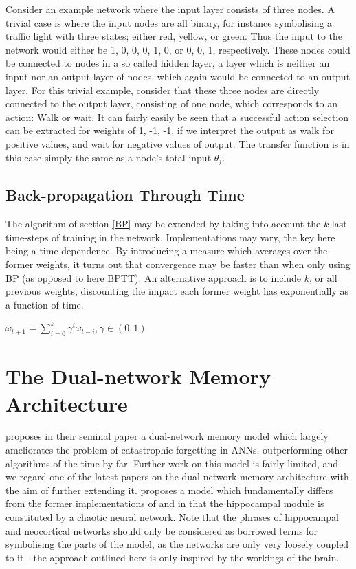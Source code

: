 Consider an example network where the input layer consists of three nodes. A trivial case is where the input nodes are all binary, for instance symbolising a traffic light with three states; either red, yellow, or green. Thus the input to the network would either be {1, 0, 0}, {0, 1, 0}, or {0, 0, 1}, respectively. These nodes could be connected to nodes in a so called hidden layer, a layer which is neither an input nor an output layer of nodes, which again would be connected to an output layer. For this trivial example, consider that these three nodes are directly connected to the output layer, consisting of one node, which corresponds to an action: Walk or wait. It can fairly easily be seen that a successful action selection can be extracted for weights of {1, -1, -1}, if we interpret the output as walk for positive values, and wait for negative values of output. The transfer function is in this case simply the same as a node's total input $\theta_j$.

\subsection{Back-propagation Through Time}

The algorithm of section \ref{BP} may be extended by taking into account the $k$ last time-steps of training in the network. Implementations may vary, the key here being a time-dependence. By introducing a measure which averages over the former weights, it turns out that convergence may be faster than when only using BP (as opposed to here BPTT). An alternative approach is to include $k$, or all previous weights, discounting the impact each former weight has exponentially as a function of time.

\begin{center}
\begin{math}
    \omega_{t+1} = \sum_{i=0}^{k}\gamma^i \omega_{t-i},
    \gamma \in (0, 1)
\end{math}
\end{center}

\section{The Dual-network Memory Architecture}

\cite{McClelland1995} proposes in their seminal paper a dual-network memory model which largely ameliorates the problem of catastrophic forgetting in ANNs, outperforming other algorithms of the time by far. Further work on this model is fairly limited, and we regard one of the latest papers on the dual-network memory architecture with the aim of further extending it. \cite{Hattori2010} proposes a model which fundamentally differs from the former implementations of \cite{French1997} and \cite{Ans1997} in that the hippocampal module is constituted by a chaotic neural network. Note that the phrases of hippocampal and neocortical networks should only be considered as borrowed terms for symbolising the parts of the model, as the networks are only very loosely coupled to it - the approach outlined here is only inspired by the workings of the brain.

